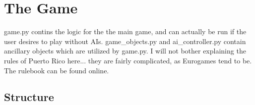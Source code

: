 
\section{The Game }

game.py contins the logic for the the main game, and can actually be run if the user desires to play without AIs.  game{\_}objects.py and ai{\_}controller.py contain ancillary objects which are utilized by game.py.  I will not bother explaining the rules of Puerto Rico here... they are fairly complicated, as Eurogames tend to be.   The rulebook can be found online.

\subsection{Structure}

